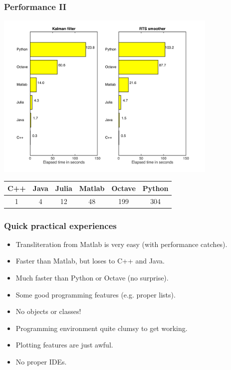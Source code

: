 \documentclass[xcolor=svgnames,english,handout]{beamer}
\begin{document}
\begin{frame}
  \frametitle{Performance II}
  \centering
  \includegraphics[width=0.8\textwidth]{kf-benchmark/times}

  \begin{tabular}{|c|c|c|c|c|c|}
  \hline
  C++     & Java    & Julia   & Matlab  & Octave  & Python  \\ 
  \hline
1       & 4       & 12      & 48      & 199     & 304     \\ 
  \hline
  \end{tabular}
\end{frame}

\begin{frame}
  \frametitle{Quick practical experiences}

  \begin{itemize}[<+->]
  \item \alert{Transliteration from Matlab} is very easy (with performance catches).
  \item Faster than \alert{Matlab}, but loses to \alert{C++ and Java}.
  \item Much faster than \alert{Python or Octave} (no surprise).
  \item Some \alert{good programming features} (e.g. proper lists).
  \item \alert{No objects or classes!}
  \item Programming environment quite \alert{clumsy to get working}.
  \item \alert{Plotting features are just awful}.
  \item \alert{No proper IDEs}.
  \end{itemize}

\end{frame}
\end{document}
